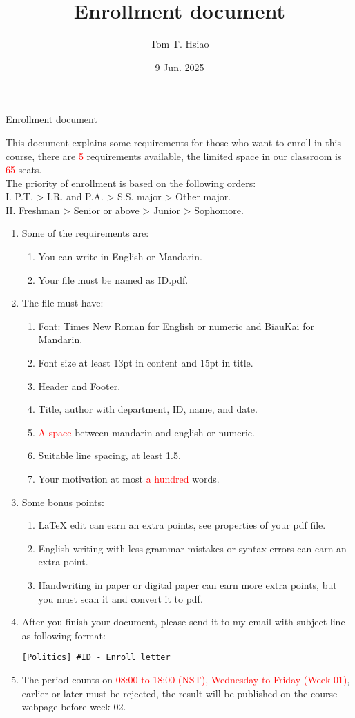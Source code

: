 \documentclass{article}
\title{Enrollment document}
\author{Tom T. Hsiao}
\date{9 Jun. 2025}
\begin{document}
\thispagestyle{fancy}
\begin{center}
\fontsize{16pt}{16pt}\selectfont Enrollment document
\end{center}
\fontsize{14pt}{14pt}\selectfont
This document explains some requirements for those who want to enroll in this course, there are \textcolor{red}{5} requirements available, the limited space in our classroom is \textcolor{red}{65} seats. \\
The priority of enrollment is based on the following orders: \\
I. P.T. > I.R. and P.A. > S.S. major > Other major. \\
II. Freshman > Senior or above > Junior > Sophomore. 
\begin{enumerate}
\item Some of the requirements are:
\begin{enumerate}
\item You can write in English or Mandarin.
\item Your file must be named as ID.pdf.
\end{enumerate}
\item The file must have:
\begin{enumerate}
\item Font: Times New Roman for English or numeric and BiauKai for Mandarin.
\item Font size at least 13pt in content and 15pt in title.
\item Header and Footer.
\item Title, author with department, ID, name, and date.
\item \textcolor{red}{A space} between mandarin and english or numeric.
\item Suitable line spacing, at least 1.5.
\item Your motivation at most \textcolor{red}{a hundred} words.
\end{enumerate}
\item Some bonus points:
\begin{enumerate}
\item LaTeX edit can earn an extra points, see properties of your pdf file.
\item English writing with less grammar mistakes or syntax errors can earn an extra point.
\item Handwriting in paper or digital paper can earn more extra points, but you must scan it and convert it to pdf.
\end{enumerate}
\item After you finish your document, please send it to my email with subject line as following format:
\begin{verbatim}
[Politics] #ID - Enroll letter
\end{verbatim}
\item The period counts on \textcolor{red}{08:00 to 18:00 (NST), Wednesday to Friday (Week 01)}, earlier or later must be rejected, the result will be published on the course webpage before week 02.
\end{enumerate}
\end{document}
